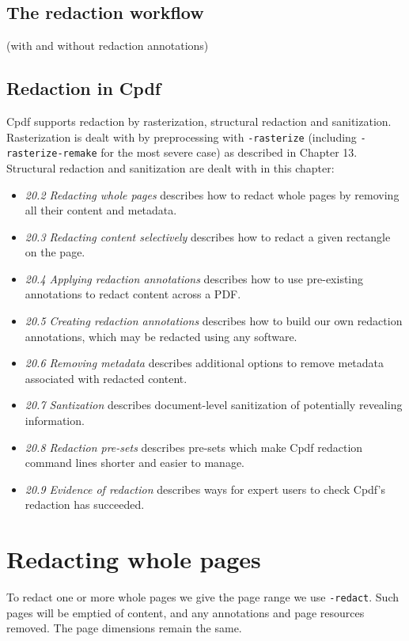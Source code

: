 \documentclass{book}
\begin{document}
\subsection{The redaction workflow}

(with and without redaction annotations)

\subsection{Redaction in Cpdf}

Cpdf supports redaction by rasterization, structural redaction and sanitization. Rasterization is dealt with by preprocessing with \texttt{-rasterize} (including \texttt{-rasterize-remake} for the most severe case) as described in Chapter 13. Structural redaction and sanitization are dealt with in this chapter:

\begin{itemize}
\item \textit{20.2 Redacting whole pages} describes how to redact whole pages by removing all their content and metadata.
\item \textit{20.3 Redacting content selectively} describes how to redact a given rectangle on the page.
\item \textit{20.4 Applying redaction annotations} describes how to use pre-existing annotations to redact content across a PDF.
\item \textit{20.5 Creating redaction annotations} describes how to build our own redaction annotations, which may be redacted using any software.
\item \textit{20.6 Removing metadata} describes additional options to remove metadata associated with redacted content.
\item \textit{20.7 Santization} describes document-level sanitization of potentially revealing information.
\item \textit{20.8 Redaction pre-sets} describes pre-sets which make Cpdf redaction command lines shorter and easier to manage.
\item \textit{20.9 Evidence of redaction} describes ways for expert users to check Cpdf's redaction has succeeded. 
\end{itemize}

\section{Redacting whole pages}

To redact one or more whole pages we give the page range we use \texttt{-redact}. Such pages will be emptied of content, and any annotations and page resources removed. The page dimensions remain the same.
\end{document}
